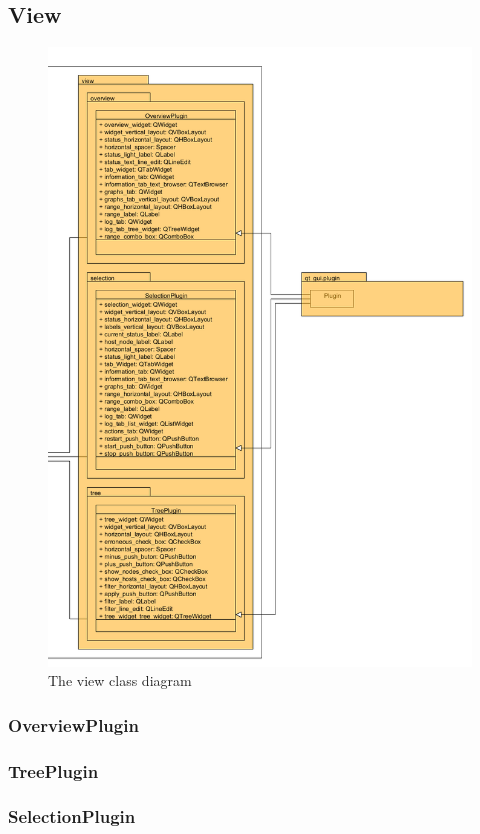 \subsection{View}

\begin{figure}[here]
\begin{center}
\includegraphics[width=\linewidth]{./bilder/view.png}
\caption{The view class diagram}
\end{center}
\end{figure}
\subsubsection{OverviewPlugin}
\subsubsection{TreePlugin}
\subsubsection{SelectionPlugin}